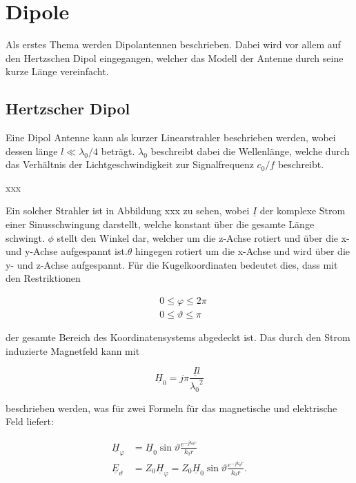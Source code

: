 \section{Dipole}

Als erstes Thema werden Dipolantennen beschrieben. Dabei wird vor allem auf den Hertzschen Dipol eingegangen, welcher das Modell der Antenne durch seine kurze Länge vereinfacht.

\subsection{Hertzscher Dipol}\label{sec:HerDip}

Eine Dipol Antenne kann als kurzer Linearstrahler beschrieben werden, wobei dessen länge $l \ll \lambda_0 /4$ beträgt. $\lambda_0$ beschreibt dabei die Wellenlänge, welche durch das Verhältnis der Lichtgeschwindigkeit zur Signalfrequenz $c_0/f$ beschreibt. 

xxx

Ein solcher Strahler ist in Abbildung xxx zu sehen, wobei $\underline{I}$ der komplexe Strom einer Sinusschwingung darstellt, welche konstant über die gesamte Länge schwingt. $\phi$ stellt den Winkel dar, welcher um die z-Achse rotiert und über die x- und y-Achse aufgespannt ist.$\theta$ hingegen rotiert um die x-Achse und wird über die y- und z-Achse aufgespannt. Für die Kugelkoordinaten bedeutet dies, dass mit den Restriktionen 

\begin{align}
&0 \leq \varphi \leq 2\pi\\
&0 \leq \vartheta \leq \pi \label{eq:HertzTheta}
\end{align}

der gesamte Bereich des Koordinatensystems abgedeckt ist. Das durch den Strom induzierte Magnetfeld kann mit 

\begin{equation}
\underline{H}_0 = j\pi \frac{\underline{I}l}{{\lambda_0}^2}
\end{equation}

beschrieben werden, was für zwei Formeln für das magnetische und elektrische Feld liefert:

\begin{align}
\underline{H}_\varphi   &= \underline{H}_0 \sin \vartheta \frac{e^{-jk_0r}}{k_0r}\\
\underline{E}_\vartheta &= Z_0 \underline{H}_\varphi = Z_0 \underline{H}_0 \sin \vartheta \frac{e^{-jk_0r}}{k_0r}.\label{eq:HertzE}
\end{align}

